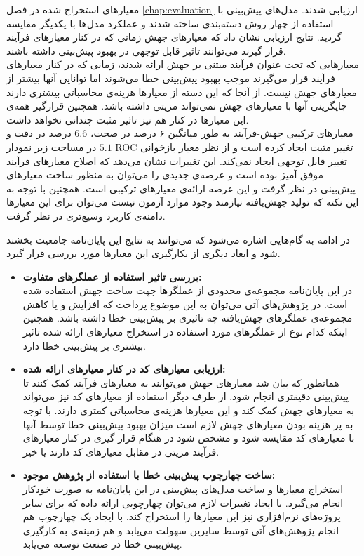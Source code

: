 معیارهای استخراج شده در فصل \ref{chap:evaluation} ارزیابی شدند.  مدل‌های پیش‌بینی با استفاده از  چهار روش دسته‌بندی ساخته شدند و عملکرد مدل‌ها با یکدیگر مقایسه گردید. نتایج ارزیابی نشان داد که معیارهای جهش زمانی که در کنار معیارهای فرآیند قرار گیرند می‌توانند تاثیر قابل توجهی در بهبود پیش‌بینی داشته باشند.\\
 معیارهایی که تحت عنوان فرآیند مبتنی بر جهش ارائه شدند، زمانی که در کنار معیارهای فرآیند قرار می‌گیرند موجب بهبود پیش‌بینی خطا می‌شوند اما توانایی آنها بیشتر از معیارهای جهش نیست. از آنجا که این دسته از معیارها هزینه‌ی محاسباتی بیشتری دارند جایگزینی آنها با معیارهای جهش نمی‌تواند مزیتی داشته باشد. همچنین قرارگیر همه‌ی این معیارها در کنار هم نیز تاثیر مثبت چندانی نخواهد داشت.\\
 معیارهای ترکیبی جهش-فرآیند به طور میانگین ۶ درصد در صحت، $6.6$ درصد در دقت و $5.1$ در مساحت زیر نمودار ROC تغییر مثبت ایجاد کرده است و از نظر معیار بازخوانی تغییر قابل توجهی ایجاد نمی‌کند. این تغییرات نشان می‌دهد که اصلاح  معیارهای فرآیند موفق آمیز بوده است و عرصه‌ی جدیدی را می‌توان به منظور ساخت معیارهای پیش‌بینی در نظر گرفت و این عرصه ارائه‌ی معیارهای ترکیبی است. همچنین با توجه به این نکته  که تولید جهش‌یافته نیازمند وجود موارد آزمون نیست می‌توان برای این معیارها دامنه‌ی کاربرد وسیع‌تری در نظر گرفت. 

در ادامه به گام‌هایی اشاره می‌شود که می‌توانند  به نتایج این پایان‌نامه   جامعیت بخشند شود و ابعاد دیگری از بکارگیری این معیارها  مورد بررسی قرار گیرد.

\begin{itemize}
	\item
	\textbf{بررسی تاثیر استفاده از عملگرهای متفاوت:}\\
	در این پایان‌نامه مجموعه‌ی محدودی از عملگرها جهت ساخت جهش استفاده شده است. در پژوهش‌های آتی می‌توان به این موضوع پرداخت که افزایش و یا  کاهش مجموعه‌ی عملگرهای جهش‌یافته چه تاثیری بر پیش‌بینی خطا داشته باشد. همچنین اینکه کدام نوع از عملگرهای مورد استفاده در استخراج معیارهای ارائه شده تاثیر بیشتری بر پیش‌بینی خطا دارد. 
	\item
	\textbf{ارزیابی معیارهای کد در کنار معیارهای ارائه شده:}\\
همانطور که بیان شد معیارهای جهش می‌توانند به معیارهای فرآیند کمک کنند تا پیش‌بینی دقیقتری انجام شود. از طرف دیگر استفاده از معیارهای کد نیز می‌تواند به معیارهای جهش کمک کند و این معیارها هزینه‌ی محاسباتی کمتری دارند. با توجه به پر هزینه بودن معیارهای جهش لازم است میزان بهبود پیش‌بینی  خطا توسط آنها با معیارهای کد مقایسه شود و مشخص شود  در هنگام قرار گیری در کنار معیارهای فرآیند مزیتی در مقابل معیارهای کد دارند یا خیر. 
\item
\textbf{ساخت چهارچوب پیش‌بینی خطا با استفاده از پژوهش موجود:}\\
استخراج معیارها و ساخت مدل‌های پیش‌بینی در این پایان‌نامه به صورت خودکار انجام می‌گیرد. با ایجاد تغییرات لازم می‌توان چهارچوبی ارائه داده که برای سایر پروژه‌های نرم‌افزاری نیز این معیارها را استخراج کند. با ایجاد یک چهارچوب هم انجام پژوهش‌های آتی توسط سایرین سهولت می‌یابد و هم زمینه‌ی به کارگیری پیش‌بینی خطا در صنعت توسعه می‌یابد. 
	
	
\end{itemize}




